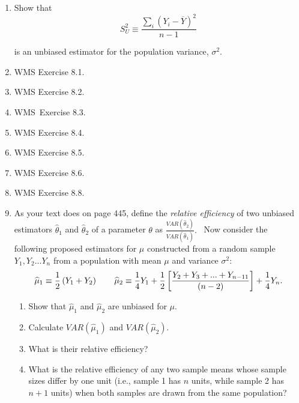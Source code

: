 \documentclass[11pt]{article}
\begin{document}
\begin{enumerate}
\item Show that%
\begin{equation*}
S_{U}^{2}\equiv \frac{\sum\nolimits_{i}\left( Y_{i}-\overline{Y}\right) ^{2}%
}{n-1}
\end{equation*}

is an unbiased estimator for the population variance, $\sigma ^{2}.$\medskip

\item WMS Exercise 8.1.

\item WMS Exercise 8.2.

\item WMS\ Exercise 8.3.

\item WMS Exercise 8.4.

\item WMS Exercise 8.5.

\item WMS Exercise 8.6.

\item WMS Exercise 8.8.

\item As your text does on page 445, define the \textit{relative efficiency }%
of two unbiased estimators $\widehat{\theta }_{1}$ and $\widehat{\theta }_{2}
$ of a parameter $\theta $ as $\frac{VAR\left( \widehat{\theta }_{2}\right) 
}{VAR\left( \widehat{\theta }_{1}\right) }.$ \ Now consider the following
proposed estimators for $\mu $ constructed from a random sample $%
Y_{1},Y_{2}...Y_{n}$ from a population with mean $\mu $ and variance $\sigma
^{2}:$%
\begin{equation*}
\widehat{\mu }_{1}\equiv \frac{1}{2}\left( Y_{1}+Y_{2}\right) \qquad 
\widehat{\mu }_{2}\equiv \frac{1}{4}Y_{1}+\frac{1}{2}\left[ \frac{%
Y_{2}+Y_{3}+...+Y_{n-11}}{\left( n-2\right) }\right] +\frac{1}{4}Y_{n}.
\end{equation*}

\begin{enumerate}
\item Show that $\widehat{\mu }_{1}$ and $\widehat{\mu }_{2}$ are unbiased
for $\mu .$

\item Calculate $VAR\left( \widehat{\mu }_{1}\right) $ and $VAR\left( 
\widehat{\mu }_{2}\right) .$

\item What is their relative efficiency?

\item What is the relative efficiency of any two sample means whose sample
sizes differ by one unit (i.e., sample 1 has $n$ units, while sample 2 has $%
n+1$ units) when both samples are drawn from the same population?
\end{enumerate}
\end{enumerate}
\end{document}
